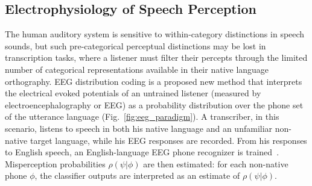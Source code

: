 \subsection{Electrophysiology of Speech Perception}

The human auditory system is sensitive to within-category distinctions
in speech sounds, but such pre-categorical perceptual distinctions may
be lost in transcription tasks, where a listener must filter their
percepts through the limited number of categorical representations
available in their native language orthography.  EEG distribution
coding is a proposed new method that interprets the electrical evoked
potentials of an untrained listener (measured by
electroencephalography or EEG) as a probability distribution
over the phone set of the utterance language
(Fig.~\ref{fig:eeg_paradigm}).  A transcriber, in this scenario, listens
to speech in both his native language and an unfamiliar non-native
target language, while his EEG responses are recorded.  From his
responses to English speech, an English-language EEG phone recognizer
is trained~\cite{Liberto15}.  Misperception probabilities
$\rho(\psi|\phi)$ are then estimated: for each non-native phone
$\phi$, the classifier outputs are interpreted as an estimate of
$\rho(\psi|\phi)$.

